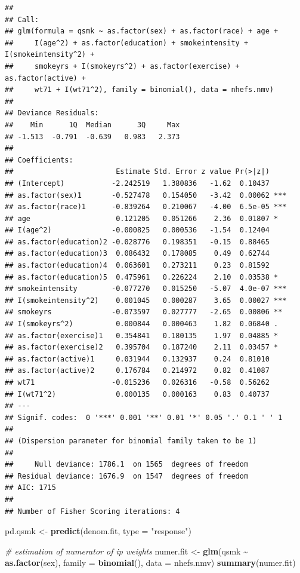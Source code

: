 \documentclass[
  10pt,
]{book}
\newenvironment{Shaded}{\begin{snugshade}}{\end{snugshade}}
\newcommand{\CommentTok}[1]{\textcolor[rgb]{0.56,0.35,0.01}{\textit{#1}}}
\newcommand{\DataTypeTok}[1]{\textcolor[rgb]{0.13,0.29,0.53}{#1}}
\newcommand{\KeywordTok}[1]{\textcolor[rgb]{0.13,0.29,0.53}{\textbf{#1}}}
\newcommand{\NormalTok}[1]{#1}
\newcommand{\OperatorTok}[1]{\textcolor[rgb]{0.81,0.36,0.00}{\textbf{#1}}}
\newcommand{\StringTok}[1]{\textcolor[rgb]{0.31,0.60,0.02}{#1}}
\begin{document}
\begin{verbatim}
## 
## Call:
## glm(formula = qsmk ~ as.factor(sex) + as.factor(race) + age + 
##     I(age^2) + as.factor(education) + smokeintensity + I(smokeintensity^2) + 
##     smokeyrs + I(smokeyrs^2) + as.factor(exercise) + as.factor(active) + 
##     wt71 + I(wt71^2), family = binomial(), data = nhefs.nmv)
## 
## Deviance Residuals: 
##    Min      1Q  Median      3Q     Max  
## -1.513  -0.791  -0.639   0.983   2.373  
## 
## Coefficients:
##                        Estimate Std. Error z value Pr(>|z|)    
## (Intercept)           -2.242519   1.380836   -1.62  0.10437    
## as.factor(sex)1       -0.527478   0.154050   -3.42  0.00062 ***
## as.factor(race)1      -0.839264   0.210067   -4.00  6.5e-05 ***
## age                    0.121205   0.051266    2.36  0.01807 *  
## I(age^2)              -0.000825   0.000536   -1.54  0.12404    
## as.factor(education)2 -0.028776   0.198351   -0.15  0.88465    
## as.factor(education)3  0.086432   0.178085    0.49  0.62744    
## as.factor(education)4  0.063601   0.273211    0.23  0.81592    
## as.factor(education)5  0.475961   0.226224    2.10  0.03538 *  
## smokeintensity        -0.077270   0.015250   -5.07  4.0e-07 ***
## I(smokeintensity^2)    0.001045   0.000287    3.65  0.00027 ***
## smokeyrs              -0.073597   0.027777   -2.65  0.00806 ** 
## I(smokeyrs^2)          0.000844   0.000463    1.82  0.06840 .  
## as.factor(exercise)1   0.354841   0.180135    1.97  0.04885 *  
## as.factor(exercise)2   0.395704   0.187240    2.11  0.03457 *  
## as.factor(active)1     0.031944   0.132937    0.24  0.81010    
## as.factor(active)2     0.176784   0.214972    0.82  0.41087    
## wt71                  -0.015236   0.026316   -0.58  0.56262    
## I(wt71^2)              0.000135   0.000163    0.83  0.40737    
## ---
## Signif. codes:  0 '***' 0.001 '**' 0.01 '*' 0.05 '.' 0.1 ' ' 1
## 
## (Dispersion parameter for binomial family taken to be 1)
## 
##     Null deviance: 1786.1  on 1565  degrees of freedom
## Residual deviance: 1676.9  on 1547  degrees of freedom
## AIC: 1715
## 
## Number of Fisher Scoring iterations: 4
\end{verbatim}

\begin{Shaded}
\begin{Highlighting}[]
\NormalTok{pd.qsmk \textless{}{-}}\StringTok{ }\KeywordTok{predict}\NormalTok{(denom.fit, }\DataTypeTok{type =} \StringTok{"response"}\NormalTok{)}

\CommentTok{\# estimation of numerator of ip weights}
\NormalTok{numer.fit \textless{}{-}}
\StringTok{  }\KeywordTok{glm}\NormalTok{(qsmk }\OperatorTok{\textasciitilde{}}\StringTok{ }\KeywordTok{as.factor}\NormalTok{(sex), }\DataTypeTok{family =} \KeywordTok{binomial}\NormalTok{(), }\DataTypeTok{data =}\NormalTok{ nhefs.nmv)}
\KeywordTok{summary}\NormalTok{(numer.fit)}
\end{Highlighting}
\end{Shaded}
\end{document}
